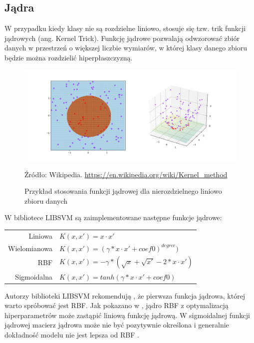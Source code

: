 \documentclass[paper=a4, fontsize=11pt]{scrartcl} %
\numberwithin{equation}{section} %
\numberwithin{figure}{section} %
\newcommand*{\captionsource}[2]{%
  \caption[{#1}]{%
      #1}
    Źródło: #2%
}
\begin{document}
\newpage
\subsection{Jądra}
    \par W przypadku kiedy klasy nie są rozdzielne liniowo, stosuje się tzw. trik funkcji jądrowych (ang. Kernel Trick).
		Funkcję jądrowe pozwalają odwzorować zbiór danych
    w przestrzeń o większej liczbie wymiarów, w której klasy danego zbioru będzie można rozdzielić
    hiperpłaszczyzną. 

    \begin{figure}[H]
        \begin{center}
            \includegraphics[scale=0.2]{./img/kernel_trick.png}
        \captionsource{Przykład stosowania funkcji jądrowej dla nierozdzielnego liniowo zbioru
        danych}{Wikipedia. \url{https://en.wikipedia.org/wiki/Kernel_method}}
        \label{fig:kernel_trick}
        \end{center}
    \end{figure}

    \par W bibliotece LIBSVM są zaimplementowane następne funkcje jądrowe:

    \begin{center}
        \begin{tabular}{rl}
            Liniowa & $K(x,x') = x\cdot x'$\\
            Wielomianowa & $K(x,x') = (\gamma*x \cdot x'+coef0)^{degree})$\\
            RBF & $K(x,x') =  -\gamma * (\sqrt{x}+\sqrt{x'}-2 * x\cdot x')$ \\
            Sigmoidalna & $K(x,x') = tanh(\gamma*x \cdot x'+coef0)$
        \end{tabular}
    \end{center}

    \par Autorzy biblioteki LIBSVM rekomendują \cite{hsu2003practical}, że pierwsza funkcja jądrowa,
    której warto spróbować jest RBF. Jak pokazano w \cite{keerthi2003asymptotic}, jądro RBF z
    optymalizacją hiperparametrów może zastąpić liniową funkcję jądrową. W sigmoidalnej
    funkcji jądrowej macierz jądrowa może nie być pozytywnie określona i generalnie dokładność modelu
    nie jest lepsza od RBF \cite{lin2003study}.
		
\end{document}
